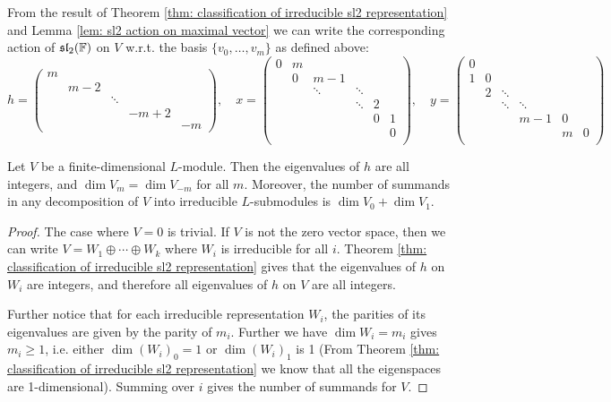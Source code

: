 \documentclass{article}
\begin{document}
\begin{corollary}
    From the result of Theorem \ref{thm: classification of irreducible sl2 representation} and Lemma \ref{lem: sl2 action on maximal vector} we can write the corresponding action of $\mathfrak{sl}_2(\mathbb{F})$ on $V$ w.r.t. the basis $\{ v_0, \dots, v_m \}$ as defined above:
    \[
        h = 
        \begin{pmatrix}
            m & & & & \\
            & m-2 & & & \\
            & & \ddots & & \\
            & & & -m+2 & \\
            & & & & -m
        \end{pmatrix}, 
        \quad
        x = 
        \begin{pmatrix}
            0 & m & & & & \\
            & 0 & m-1 & & & \\
            & & \ddots & \ddots & & \\
            & & & \ddots & 2 & \\
            & & & & 0 & 1 \\
            & & & & & 0 \\
        \end{pmatrix},
        \quad
        y = 
        \begin{pmatrix}
            0 & & & & & \\
            1 & 0 & & & & \\
            & 2 & \ddots & & & \\
            & & \ddots & \ddots & & \\
            & & & m-1 & 0 & \\
            & & & & m & 0 \\
        \end{pmatrix}
    \]
\end{corollary}
\nogap
\begin{corollary}
    Let $V$ be a finite-dimensional $L$-module. Then the eigenvalues of $h$ are all integers, and $\dim V_m = \dim V_{-m}$ for all $m$. Moreover, the number of summands in any decomposition of $V$ into irreducible $L$-submodules is $\dim V_0 + \dim V_1$.
\end{corollary}

\begin{proof}
    The case where $V = 0$ is trivial. If $V$ is not the zero vector space, then we can write $V = W_1 \oplus \cdots \oplus W_k$ where $W_i$ is irreducible for all $i$. Theorem \ref{thm: classification of irreducible sl2 representation} gives that the eigenvalues of $h$ on $W_i$ are integers, and therefore all eigenvalues of $h$ on $V$ are all integers.

    Further notice that for each irreducible representation $W_i$, the parities of its eigenvalues are given by the parity of $m_i$. Further we have $\dim W_i = m_i$ gives $m_i \geq 1$, i.e. either $\dim (W_i)_0 = 1$ or $\dim (W_i)_1$ is 1 (From Theorem \ref{thm: classification of irreducible sl2 representation} we know that all the eigenspaces are 1-dimensional). Summing over $i$ gives the number of summands for $V$.
\end{proof}
\end{document}
